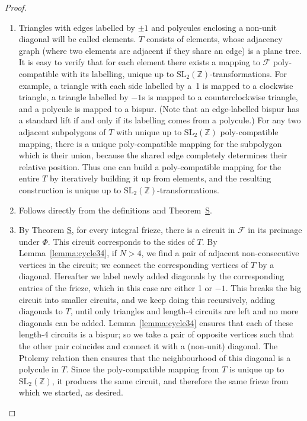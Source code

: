 \documentclass[12pt]{article}
\theoremstyle{definition}
\newcommand{\Z}{\mathbb{Z}}
\newcommand{\SL}[1]{\ensuremath{\mathrm{SL}_{#1}}}
\newcommand{\F}{\mathscr{F}}
\begin{document}
\begin{proof}
\begin{enumerate}[label=(\roman*)]
\item
Triangles with edges labelled by $\pm1$ and polycules enclosing a non-unit diagonal will be called elements. $T$ consists of elements, whose adjacency graph (where two elements are adjacent if they share an edge) is a plane tree. It is easy to verify that for each element there exists a mapping to $\F$ poly-compatible with its labelling, unique up to $\SL2(\Z)$-transformations. For example, a triangle with each side labelled by a~1 is mapped to a clockwise triangle, a triangle labelled by $-1$s is mapped to a counterclockwise triangle, and a polycule is mapped to a bispur. (Note that an edge-labelled bispur has a standard lift if and only if its labelling comes from a polycule.) For any two adjacent subpolygons of $T$ with unique up to $\SL2(\Z)$ poly-compatible mapping, there is a unique poly-compatible mapping for the subpolygon which is their union, because the shared edge completely determines their relative position. Thus one can build a poly-compatible mapping for the entire $T$ by iteratively building it up from elements, and the resulting construction is unique up to $\SL2(\Z)$-transformations.
\item
Follows directly from the definitions and Theorem~\hyperlink{thm:s}{S}.
\item
By Theorem \hyperlink{thm:s}{S}, for every integral frieze, there is a circuit in $\F$ in its preimage under $\Phi$. This circuit corresponds to the sides of $T$. By Lemma~\ref{lemma:cycle34}, if $N>4$, we find a pair of adjacent non-consecutive vertices in the circuit; we connect the corresponding vertices of $T$ by a diagonal. Hereafter we label newly added diagonals by the corresponding entries of the frieze, which in this case are either 1 or $-1$. This breaks the big circuit into smaller circuits, and we keep doing this recursively, adding diagonals to $T$, until only triangles and length-4 circuits are left and no more diagonals can be added. Lemma~\ref{lemma:cycle34} ensures that each of these length-4 circuits is a bispur; so we take a pair of opposite vertices such that the other pair coincides and connect it with a (non-unit) diagonal. The Ptolemy relation then ensures that the neighbourhood of this diagonal is a polycule in $T$.
Since the poly-compatible mapping from $T$ is unique up to $\SL2(\Z)$, it produces the same circuit, and therefore the same frieze from which we started, as desired.
\qedhere
\end{enumerate}
\end{proof}
\end{document}

